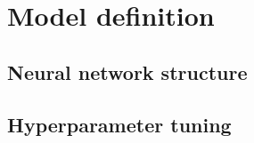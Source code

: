 \section{Model definition}
\label{model-definition}

\subsection{Neural network structure}
\subsection{Hyperparameter tuning}